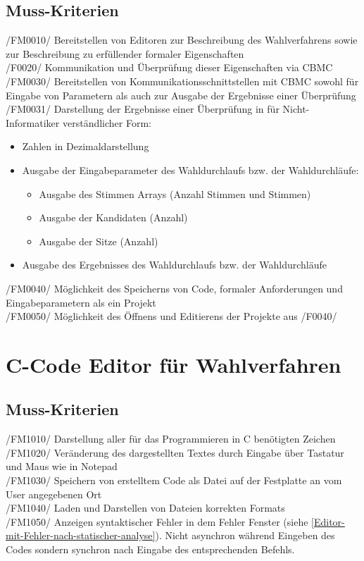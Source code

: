 \documentclass[a4paper]{scrreprt}
\begin{document}
\subsection{Muss-Kriterien}
/FM0010/ Bereitstellen von Editoren zur Beschreibung des Wahlverfahrens sowie zur Beschreibung zu erfüllender formaler Eigenschaften \\
/F0020/ Kommunikation und Überprüfung dieser Eigenschaften via \ac{CBMC} \\
/FM0030/ Bereitstellen von Kommunikationsschnittstellen mit \ac{CBMC} sowohl für Eingabe von Parametern als auch zur Ausgabe der Ergebnisse einer Überprüfung \\
/FM0031/ Darstellung der Ergebnisse einer Überprüfung in für Nicht-Informatiker verständlicher Form:
\begin{itemize}
\item Zahlen in Dezimaldarstellung
\item Ausgabe der Eingabeparameter des Wahldurchlaufs bzw. der Wahldurchläufe:
\begin{itemize}
\item Ausgabe des Stimmen Arrays (Anzahl Stimmen und Stimmen) 
\item Ausgabe der Kandidaten (Anzahl)
\item Ausgabe der Sitze (Anzahl)
\end{itemize}
\item Ausgabe des Ergebnisses des Wahldurchlaufs bzw. der Wahldurchläufe
\end{itemize} 
/FM0040/ Möglichkeit des Speicherns von Code, formaler Anforderungen und Eingabeparametern als ein Projekt \\
/FM0050/ Möglichkeit des Öffnens und Editierens der Projekte aus /F0040/


\section{C-Code Editor für Wahlverfahren}
\subsection{Muss-Kriterien}
/FM1010/ Darstellung aller für das Programmieren in C benötigten Zeichen \\
/FM1020/ Veränderung des dargestellten Textes durch Eingabe über Tastatur und Maus wie in Notepad \\
/FM1030/ Speichern von erstelltem Code als Datei auf der Festplatte an vom User angegebenen Ort \\
/FM1040/ Laden und Darstellen von Dateien korrekten Formats \\
/FM1050/ Anzeigen syntaktischer Fehler in dem Fehler Fenster (siehe \ref{Editor-mit-Fehler-nach-statischer-analyse}). Nicht asynchron während Eingeben des Codes sondern synchron nach Eingabe des entsprechenden Befehls.
\end{document}
